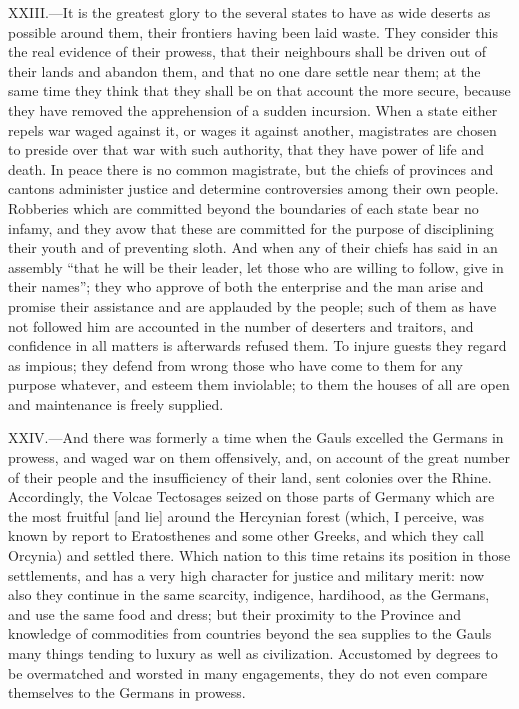 XXIII.—It is the greatest glory to the several states to have as wide
deserts as possible around them, their frontiers having been laid waste.
They consider this the real evidence of their prowess, that their
neighbours shall be driven out of their lands and abandon them, and that
no one dare settle near them; at the same time they think that they
shall be on that account the more secure, because they have removed the
apprehension of a sudden incursion. When a state either repels war waged
against it, or wages it against another, magistrates are chosen to
preside over that war with such authority, that they have power of life
and death. In peace there is no common magistrate, but the chiefs of
provinces and cantons administer justice and determine controversies
among their own people. Robberies which are committed beyond the
boundaries of each state bear no infamy, and they avow that these are
committed for the purpose of disciplining their youth and of preventing
sloth. And when any of their chiefs has said in an assembly ``that he
will be their leader, let those who are willing to follow, give in their
names''; they who approve of both the enterprise and the man arise and
promise their assistance and are applauded by the people; such of them
as have not followed him are accounted in the number of deserters and
traitors, and confidence in all matters is afterwards refused them. To
injure guests they regard as impious; they defend from wrong those who
have come to them for any purpose whatever, and esteem them inviolable;
to them the houses of all are open and maintenance is freely supplied.

XXIV.—And there was formerly a time when the Gauls excelled the Germans
in prowess, and waged war on them offensively, and, on account of the
great number of their people and the insufficiency of their land, sent
colonies over the Rhine. Accordingly, the Volcae Tectosages seized on
those parts of Germany which are the most fruitful [and lie] around the
Hercynian forest (which, I perceive, was known by report to Eratosthenes
and some other Greeks, and which they call Orcynia) and settled there.
Which nation to this time retains its position in those settlements, and
has a very high character for justice and military merit: now also they
continue in the same scarcity, indigence, hardihood, as the Germans, and
use the same food and dress; but their proximity to the Province and
knowledge of commodities from countries beyond the sea supplies to the
Gauls many things tending to luxury as well as civilization. Accustomed
by degrees to be overmatched and worsted in many engagements, they do
not even compare themselves to the Germans in prowess.

